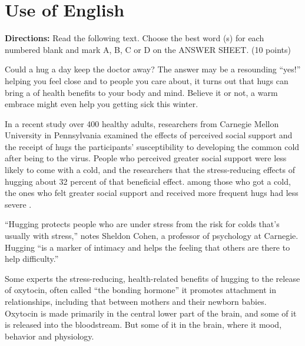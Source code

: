 


\section{Use of English}

\noindent
\textbf{Directions:}
Read the following text. Choose the best word (s) for each numbered blank
and mark A, B, C or D on the ANSWER SHEET. (10 points)


\TiGanSpace


Could a hug a day keep the doctor away? The answer may be a resounding
``yes!'' \cloze helping you feel close and \cloze to
people you care about, it turns out that hugs can bring a \cloze
of health benefits to your body and mind. Believe it or not, a warm
embrace might even help you \cloze getting sick this winter.

In a recent study \cloze over 400 healthy adults, researchers
from Carnegie Mellon University in Pennsylvania examined the effects of
perceived social support and the receipt of hugs \cloze the
participants' susceptibility to developing the common cold after being
\cloze to the virus. People who perceived greater social support
were less likely to come \cloze with a cold, and the researchers
\cloze that the stress-reducing effects of hugging \cloze
about 32 percent of that beneficial effect. \cloze among those
who got a cold, the ones who felt greater social support and received
more frequent hugs had less severe \cloze.

``Hugging protects people who are under stress from the \cloze
risk for colds that's usually \cloze with stress,'' notes
Sheldon Cohen, a professor of psychology at Carnegie. Hugging ``is a
marker of intimacy and helps \cloze the feeling that others are
there to help \cloze difficulty.''

Some experts \cloze the stress-reducing, health-related
benefits of hugging to the release of oxytocin, often called ``the
bonding hormone'' \cloze it promotes attachment in
relationships, including that between mothers and their newborn babies.
Oxytocin is made primarily in the central lower part of the brain, and
some of it is released into the bloodstream. But some of it
\cloze in the brain, where it \cloze mood, behavior and
physiology.


\newpage

